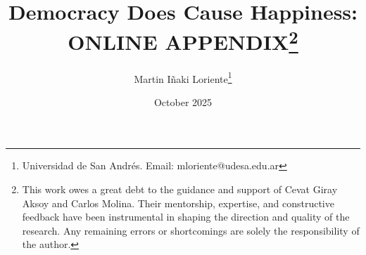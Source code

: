 \documentclass[11pt]{article}
\begin{document}
	
\renewcommand\thefootnote{\fnsymbol{footnote}}
\begin{titlepage}
	
	\title{\textbf{Democracy Does Cause Happiness: ONLINE APPENDIX}\footnote{This work owes a great debt to the guidance and support of Cevat Giray Aksoy and Carlos Molina. Their mentorship, expertise, and constructive feedback have been instrumental in shaping the direction and quality of the research. Any remaining errors or shortcomings are solely the responsibility of the author.}}
	
	\normalsize
	
	\bigskip
	
	\renewcommand{\thefootnote}{\arabic{footnote}}
	\addtocounter{footnote}{+2}
	
	\bigskip
	
	\author{\Large{Martin Iñaki Loriente}\thanks{Universidad de San Andrés. Email: mloriente@udesa.edu.ar}\qquad \vspace{5mm}}
	
	\vspace{5mm}
	
	\date{\vspace{5mm} October 2025}
	
	\singlespacing
	\clearpage\maketitle
	\thispagestyle{empty}
	
	\vspace{3mm}
	

\end{titlepage}
\end{document}
